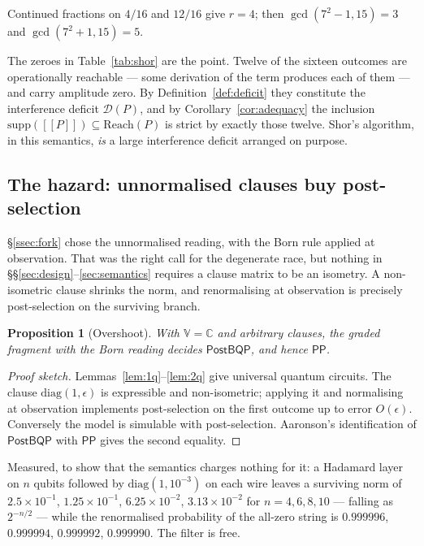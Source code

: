 \documentclass[11pt,a4paper]{article}
\theoremstyle{plain}
\newtheorem{proposition}[theorem]{Proposition}
\theoremstyle{definition}
\theoremstyle{remark}
\newcommand{\sem}[1]{[\![#1]\!]}
\newcommand{\V}{\mathbb{V}}
\newcommand{\Cx}{\mathbb{C}}
\newcommand{\Reach}{\mathrm{Reach}}
\newcommand{\supp}{\mathrm{supp}}
\begin{document}
\noindent
Continued fractions on $4/16$ and $12/16$ give $r = 4$; then
$\gcd(7^2-1,15) = 3$ and $\gcd(7^2+1,15) = 5$.

The zeroes in Table~\ref{tab:shor} are the point. Twelve of the sixteen outcomes
are operationally reachable --- some derivation of the term produces each of them
--- and carry amplitude zero. By Definition~\ref{def:deficit} they constitute the
interference deficit $\mathcal{D}(P)$, and by Corollary~\ref{cor:adequacy} the
inclusion $\supp(\sem{P}) \subseteq \Reach(P)$ is strict by exactly those twelve.
Shor's algorithm, in this semantics, \emph{is} a large interference deficit
arranged on purpose.

\subsection{The hazard: unnormalised clauses buy post-selection}\label{ssec:hazard}

\S\ref{ssec:fork} chose the unnormalised reading, with the Born rule applied at
observation. That was the right call for the degenerate race, but nothing in
\S\S\ref{sec:design}--\ref{sec:semantics} requires a clause matrix to be an
isometry. A non-isometric clause shrinks the norm, and renormalising at
observation is precisely post-selection on the surviving branch.

\begin{proposition}[Overshoot]\label{prop:postbqp}
With $\V = \Cx$ and arbitrary clauses, the graded fragment with the Born reading
decides $\mathsf{PostBQP}$, and hence $\mathsf{PP}$.
\end{proposition}

\begin{proof}[Proof sketch]
Lemmas~\ref{lem:1q}--\ref{lem:2q} give universal quantum circuits. The clause
$\mathrm{diag}(1,\epsilon)$ is expressible and non-isometric; applying it and
normalising at observation implements post-selection on the first outcome up to
error $O(\epsilon)$. Conversely the model is simulable with post-selection.
Aaronson's identification of $\mathsf{PostBQP}$ with $\mathsf{PP}$ gives the
second equality.
\end{proof}

Measured, to show that the semantics charges nothing for it: a Hadamard layer on
$n$ qubits followed by $\mathrm{diag}(1,10^{-3})$ on each wire leaves a surviving
norm of $2.5\times 10^{-1}$, $1.25\times 10^{-1}$, $6.25\times 10^{-2}$,
$3.13\times 10^{-2}$ for $n = 4,6,8,10$ --- falling as $2^{-n/2}$ --- while the
renormalised probability of the all-zero string is
$0.999996$, $0.999994$, $0.999992$, $0.999990$. The filter is free.
\end{document}
